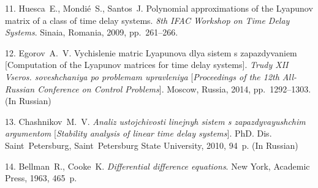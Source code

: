 {11. Huesca~E., Mondi\'e~S., Santos~J. Polynomial approximations of
the Lyapunov matrix of a class of time delay systems. \textit{8th
IFAC Workshop on Time Delay Systems}. Sinaia, Romania, 2009,
pp.~261--266.

12. Egorov~A.~V. Vychislenie matric Lyapunova dlya sistem s
zapazdyvaniem [Computation of the Lyapunov matrices for time delay
systems]. \textit{Trudy XII Vseros. soveshchaniya po problemam
upravleniya} [\textit{Proceedings of the 12th All-Russian
Conference on Control Problems}]. Moscow, Russia, 2014,
pp.~1292--1303. (In Russian)

13. Chashnikov~M.~V. \textit{Analiz ustojchivosti linejnyh sistem
s zapazdyvayushchim argumentom} [\textit{Stability analysis of
linear time delay systems}]. PhD. Dis. Saint~Petersburg,
Saint~Peter\-sburg State University, 2010, 94~p. (In Russian)

14. Bellman~R., Cooke~K. \textit{Differential difference
equations}. New York, Academic Press, 1963, 465~p.




}
